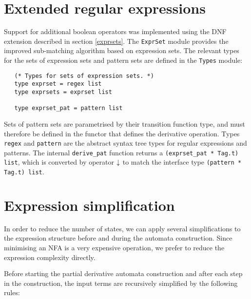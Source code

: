 \section{Extended regular expressions}

Support for additional boolean operators was implemented using the DNF extension
described in section \ref{exprsets}.  The \texttt{ExprSet} module provides the
improved sub-matching algorithm based on expression sets.  The relevant types
for the sets of expression sets and pattern sets are defined in the
\texttt{Types} module:

\begin{lstlisting}
   (* Types for sets of expression sets. *)
   type exprset = regex list
   type exprsets = exprset list

   type exprset_pat = pattern list
\end{lstlisting}

Sets of pattern sets are parametrised by their transition function type, and
must therefore be defined in the functor that defines the derivative operation.
Types \texttt{regex} and \texttt{pattern} are the abstract syntax tree types for
regular expressions and patterns. The internal \texttt{derive\_pat} function
returns a \verb!(exprset_pat * Tag.t) list!, which is converted by operator
$\downarrow$ to match the interface type \verb!(pattern * Tag.t) list!.




\section{Expression simplification}

In order to reduce the number of states, we can apply several simplifications to
the expression structure before and during the automata construction. Since
minimising an NFA is a very expensive operation, we prefer to reduce the
expression complexity directly.

Before starting the partial derivative automata construction and after each step
in the construction, the input terms are recursively simplified by the following
rules:

